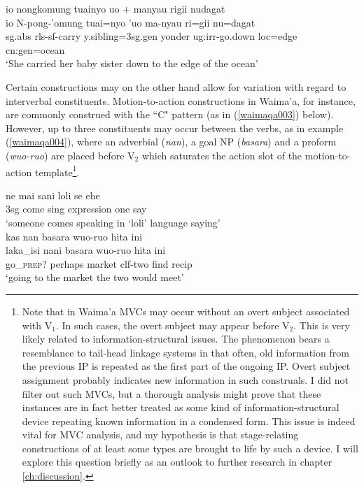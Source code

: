 \ea \label{}
\gll io nongkomung tuainyo uo + manyau rigii nudagat \\
io N-pong-'omung tuai=nyo 'uo ma-nyau ri=gii nu=dagat \\
\acs{sg}.\acs{abs} \acs{rls}-\acs{sf}-carry y.sibling=3\acs{sg}.\acs{gen} yonder \acs{ug}:\acs{irr}-go.down \acs{loc}=edge \acs{cn}:\acs{gen}=ocean \\
\glft `She carried her baby sister down to the edge of the ocean' \\ 
\z
\xe

Certain constructions may on the other hand allow for variation with regard to interverbal constituents. Motion-to-action constructions in Waima'a, for instance, are commonly construed with the ``C" pattern (as in (\ref{waimaqa003}) below). However, up to three constituents may occur between the verbs, as in example (\ref{waimaqa004}), where an adverbial (\textit{nan}), a goal NP (\textit{basara}) and a proform (\textit{wuo-ruo}) are placed before V$_2$ which saturates the action slot of the motion-to-action template\footnote{Note that in Waima'a MVCs may occur without an overt subject associated with V$_1$. In such cases, the overt subject may appear before V$_2$. This is very likely related to information-structural issues. The phenomenon bears a resemblance to tail-head linkage systems in that often, old information from the previous IP is repeated as the first part of the ongoing IP. Overt subject assignment probably indicates new information in such construals. I did not filter out such MVCs, but a thorough analysis might prove that these instances are in fact better treated as some kind of information-structural device repeating known information in a condensed form. This issue is indeed vital for MVC analysis, and my hypothesis is that stage-relating constructions of at least some types are brought to life by such a device. I will explore this question briefly as an outlook to further research in chapter \ref{ch:discussion}.}.

\ea \label{waimaqa003}
\gll ne mai sani loli se ehe \\
3\acs{sg} come sing expression one say \\
\glft `someone comes speaking in `loli' language saying' \\ 
\z
\xe
\ea \label{waimaqa004}
\gll kas nan basara wuo-ruo hita ini \\ 
laka\_isi nani basara wuo-ruo hita ini \\
\glc go\_\textsc{prep?} perhaps market \acs{clf}-two find \acs{recip} \\
\glft `going to the market the two would meet' \\ 
\z
\xe


